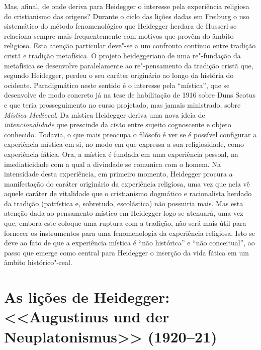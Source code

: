 Mas, afinal, de onde deriva para Heidegger o interesse pela
experiência religiosa do cristianismo das origens? Durante o
ciclo das lições dadas em Freiburg o uso sistemático do método
fenomenológico que Heidegger herdara de Husserl se relaciona
sempre mais frequentemente com motivos que provêm do âmbito
religioso. Esta atenção particular deve"-se a um confronto
contínuo entre tradição cristã e tradição metafísica. O projeto
heideggeriano de uma re"-fundação da metafísica se desenvolve
paralelamente ao re"-pensamento da tradição cristã que, segundo
Heidegger, perdeu o seu caráter originário ao longo da história
do ocidente. Paradigmático neste sentido é o interesse pela
“mística”, que se desenvolve de modo concreto já na tese de
habilitação de 1916 sobre Duns Scotus e que teria prosseguimento
no curso projetado, mas jamais ministrado, sobre \emph{Mística
Medieval}. Da mística Heidegger deriva uma nova ideia de
\emph{intencionalidade} que prescinde da cisão entre sujeito
cognoscente e objeto conhecido. Todavia, o que mais preocupa o
filósofo é ver se é possível configurar a experiência mística em
si, no modo em que expressa a sua religiosidade, como
experiência fática. Ora, a mística é fundada em uma experiência
pessoal, na imediaticidade com a qual a divindade se comunica
com o homem. Na intensidade desta experiência, em primeiro
momento, Heidegger procura a manifestação do caráter originário
da experiência religiosa, uma vez que nela vê aquele caráter de
vitalidade que o cristianismo dogmático e racionalista herdado
da tradição (patrística e, sobretudo, escolástica) não possuiria
mais. Mas esta atenção dada ao pensamento místico em Heidegger
logo se atenuará, uma vez que, embora este coloque uma ruptura
com a tradição, não será mais útil para fornecer os instrumentos
para uma fenomenologia da experiência religiosa. Isto se deve ao
fato de que a experiência mística é “não histórica” e
“não conceitual”, ao passo que emerge como central para
Heidegger o inserção da vida fática em um âmbito histórico"-real.
 

\section{As lições de Heidegger: <<Augustinus
und der Neuplatonismus>> (1920--21)}

